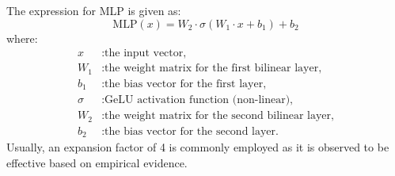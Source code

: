 The expression for MLP is given as:\\

\[\text{MLP}(x) = W_2 \cdot \sigma(W_1 \cdot x + b_1) + b_2\]
where:
\begin{align*}
    x & : \text{the input vector,} \\
    W_1 & : \text{the weight matrix for the first bilinear layer,} \\
    b_1 & : \text{the bias vector for the first layer,} \\
    \sigma & : \text{GeLU activation function (non-linear),} \\
    W_2 & : \text{the weight matrix for the second bilinear layer,} \\
    b_2 & : \text{the bias vector for the second layer.}
\end{align*}
Usually, an expansion factor of 4 is commonly employed as it is observed to be effective based on empirical evidence.\\
\\

